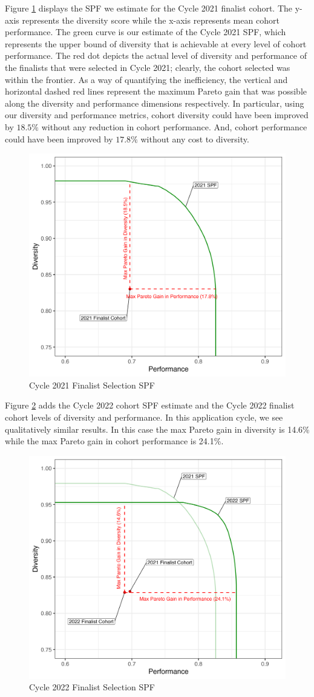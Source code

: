Figure \ref{fig:yr1_spf} displays the SPF we estimate for the Cycle 2021 finalist cohort. The y-axis represents the diversity score while the x-axis represents mean cohort performance. The green curve is our estimate of the Cycle 2021 SPF, which represents the upper bound of diversity that is achievable at every level of cohort performance. The red dot depicts the actual level of diversity and performance of the finalists that were selected in Cycle 2021; clearly, the cohort selected was within the frontier. As a way of quantifying the inefficiency, the vertical and horizontal dashed red lines represent the maximum Pareto gain that was possible along the diversity and performance dimensions respectively. In particular, using our diversity and performance metrics, cohort diversity could have been improved by $18.5\%$ without any reduction in cohort performance. And, cohort performance could have been improved by $17.8\%$ without any cost to diversity. 

\begin{figure}[htb]
    \centering
    \includegraphics[width=.6\textwidth,keepaspectratio]{figures/spf/yr1_spf_finalist.png} 
    \caption{Cycle 2021 Finalist Selection SPF}\label{fig:yr1_spf}
\end{figure}

Figure \ref{fig:yr2_spf} adds the Cycle 2022 cohort SPF estimate and the Cycle 2022 finalist cohort levels of diversity and performance. In this application cycle, we see qualitatively similar results. In this case the max Pareto gain in diversity is 14.6\% while the max Pareto gain in cohort performance is 24.1\%.

\begin{figure}[htb]
    \centering
    \includegraphics[width=.6\textwidth,keepaspectratio]{figures/spf/yr2_spf_finalist.png}
    \caption{Cycle 2022 Finalist Selection SPF}\label{fig:yr2_spf}
\end{figure}

